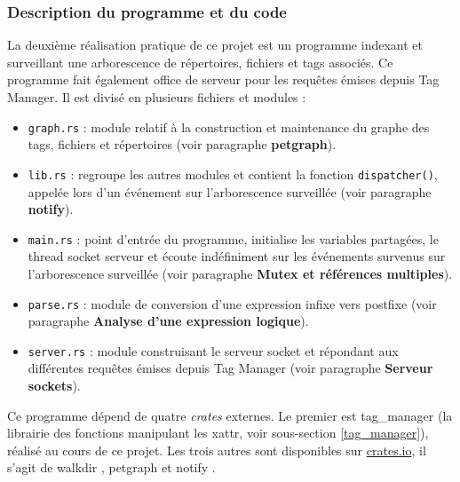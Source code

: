 \subsubsection{Description du programme et du code}
La deuxième réalisation pratique de ce projet est un programme indexant et surveillant une arborescence de 
répertoires, fichiers et tags associés. Ce programme fait également office de serveur pour les 
requêtes émises depuis Tag Manager. Il est divisé en plusieurs fichiers et modules :
\begin{itemize}
    \item \texttt{graph.rs} : module relatif à la construction et 
        maintenance du graphe des tags, fichiers et répertoires (voir paragraphe \textbf{petgraph}).
    \item \texttt{lib.rs} : regroupe les autres modules et contient la fonction 
        \texttt{dispatcher()}, appelée lors d'un événement sur l'arborescence surveillée 
        (voir paragraphe \textbf{notify}).
    \item \texttt{main.rs} : point d'entrée du programme, initialise les variables 
        partagées, le thread socket serveur et écoute indéfiniment sur les événements survenus 
        sur l'arborescence surveillée (voir paragraphe \textbf{Mutex et références multiples}).
    \item \texttt{parse.rs} : module de conversion d'une expression infixe vers postfixe 
        (voir paragraphe \textbf{Analyse d'une expression logique}).
    \item \texttt{server.rs} : module construisant le serveur socket et répondant 
        aux différentes requêtes émises depuis Tag Manager (voir paragraphe \textbf{Serveur sockets}).
\end{itemize}
Ce programme dépend de quatre \textit{crates} externes. Le premier est 
tag\_manager (la librairie des fonctions manipulant les \acrshort{xattr}, voir sous-section \ref{tag_manager}), 
réalisé au cours de ce projet. Les trois autres sont disponibles sur \href{https://crates.io}{crates.io}, 
il s'agit de walkdir \cite{ref43}, petgraph \cite{ref44} et notify \cite{ref45}.

